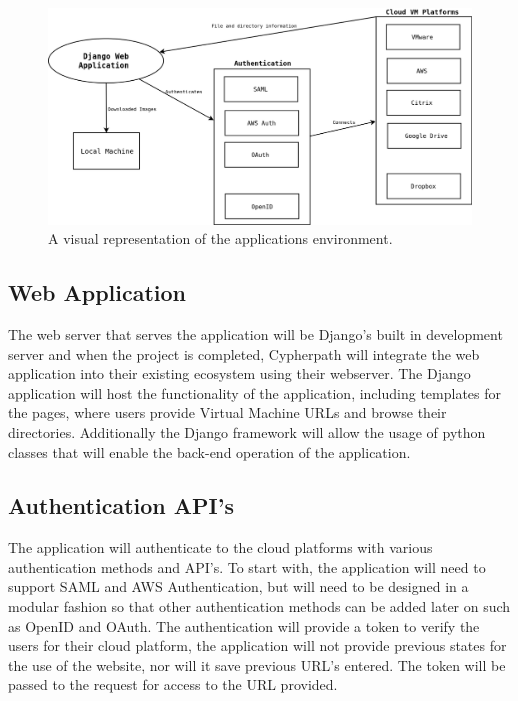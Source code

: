 \documentclass{article}
\begin{document}
    \begin{figure}[h]
    \includegraphics[scale=.4]{downloader_env}
        \caption{A visual representation of the applications environment.}
    \end{figure}


        \subsection{Web Application}
        The web server that serves the application will be Django's built in development server and when the project is completed, Cypherpath will integrate
        the web application into their existing ecosystem using their webserver. The Django application will host the functionality of the application, including templates for the 
        pages, where users provide Virtual Machine URLs and browse their directories. Additionally the Django framework will allow the usage of python classes that will enable the 
        back-end operation of the application.

        
        \subsection{Authentication API's}
        The application will authenticate to the cloud platforms with various authentication methods and API's. To start with, the application will need to support
        SAML and AWS Authentication, but will need to be designed in a modular fashion so that other authentication methods can be added later on such as OpenID and OAuth.
        The authentication will provide a token to verify the users for their cloud platform, the application will not provide previous states for the use of the 
        website, nor will it save previous URL's entered. The token will be passed to the request for access to the URL provided.
\end{document}
